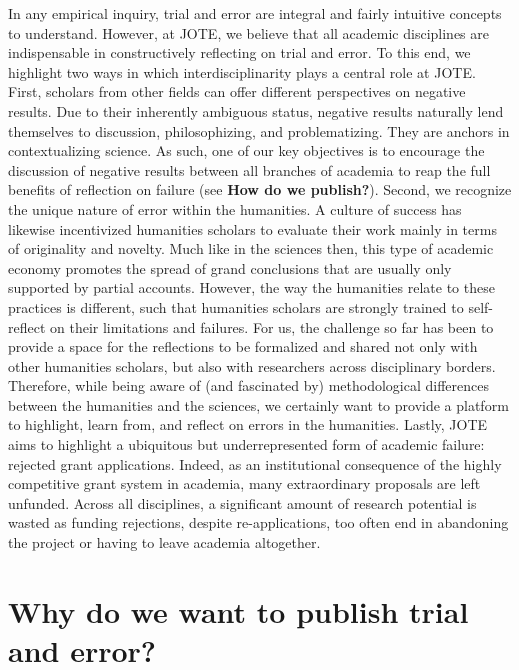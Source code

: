 \documentclass[twocolumn, serif, editorial, authordate]{jote-article}
\begin{document}
In any empirical inquiry, trial and error are integral and fairly intuitive concepts to understand. However, at JOTE, we believe that all academic disciplines are indispensable in constructively reflecting on trial and error. To this end, we highlight two ways in which interdisciplinarity plays a central role at JOTE. First, scholars from other fields can offer different perspectives on negative results. Due to their inherently ambiguous status, negative results naturally lend themselves to discussion, philosophizing, and problematizing. They are anchors in contextualizing science. As such, one of our key objectives is to encourage the discussion of negative results between all branches of academia to reap the full benefits of reflection on failure (see \textbf{How do we publish?}). Second, we recognize the unique nature of error within the humanities. A culture of success has likewise incentivized humanities scholars to evaluate their work mainly in terms of originality and novelty. Much like in the sciences then, this type of academic economy promotes the spread of grand conclusions that are usually only supported by partial accounts. However, the way the humanities relate to these practices is different, such that humanities scholars are strongly trained to self-reflect on their limitations and failures. For us, the challenge so far has been to provide a space for the reflections to be formalized and shared not only with other humanities scholars, but also with researchers across disciplinary borders. Therefore, while being aware of (and fascinated by) methodological differences between the humanities and the sciences, we certainly want to provide a platform to highlight, learn from, and reflect on errors in the humanities. Lastly, JOTE aims to highlight a ubiquitous but underrepresented form of academic failure: rejected grant applications. Indeed, as an institutional consequence of the highly competitive grant system in academia, many extraordinary proposals are left unfunded. Across all disciplines, a significant amount of research potential is wasted as funding rejections, despite re-applications, too often end in abandoning the project or having to leave academia altogether.


 {} \section*{Why do we want to publish trial and error?}
\end{document}
